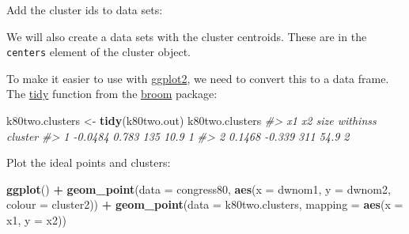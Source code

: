 \documentclass[]{book}
\newenvironment{Shaded}{\begin{snugshade}}{\end{snugshade}}
\newcommand{\CommentTok}[1]{\textcolor[rgb]{0.56,0.35,0.01}{\textit{#1}}}
\newcommand{\DataTypeTok}[1]{\textcolor[rgb]{0.13,0.29,0.53}{#1}}
\newcommand{\DecValTok}[1]{\textcolor[rgb]{0.00,0.00,0.81}{#1}}
\newcommand{\KeywordTok}[1]{\textcolor[rgb]{0.13,0.29,0.53}{\textbf{#1}}}
\newcommand{\NormalTok}[1]{#1}
\newcommand{\OperatorTok}[1]{\textcolor[rgb]{0.81,0.36,0.00}{\textbf{#1}}}
\newcommand{\StringTok}[1]{\textcolor[rgb]{0.31,0.60,0.02}{#1}}
\theoremstyle{definition}
\theoremstyle{definition}
\theoremstyle{definition}
\theoremstyle{remark}
\begin{document}
Add the cluster ids to data sets:

\begin{Shaded}
\end{Shaded}

We will also create a data sets with the cluster centroids. These are in
the \texttt{centers} element of the cluster object.

\begin{Shaded}
\end{Shaded}

To make it easier to use with
\href{https://cran.r-project.org/package=ggplot2}{ggplot2}, we need to
convert this to a data frame. The
\href{https://www.rdocumentation.org/packages/broom/topics/tidy}{tidy}
function from the \href{https://cran.r-project.org/package=broom}{broom}
package:

\begin{Shaded}
\begin{Highlighting}[]
\NormalTok{k80two.clusters <-}\StringTok{ }\KeywordTok{tidy}\NormalTok{(k80two.out)}
\NormalTok{k80two.clusters}
\CommentTok{#>        x1     x2 size withinss cluster}
\CommentTok{#> 1 -0.0484  0.783  135     10.9       1}
\CommentTok{#> 2  0.1468 -0.339  311     54.9       2}
\end{Highlighting}
\end{Shaded}

Plot the ideal points and clusters:

\begin{Shaded}
\begin{Highlighting}[]
\KeywordTok{ggplot}\NormalTok{() }\OperatorTok{+}
\StringTok{  }\KeywordTok{geom_point}\NormalTok{(}\DataTypeTok{data =}\NormalTok{ congress80,}
             \KeywordTok{aes}\NormalTok{(}\DataTypeTok{x =}\NormalTok{ dwnom1, }\DataTypeTok{y =}\NormalTok{ dwnom2, }\DataTypeTok{colour =}\NormalTok{ cluster2)) }\OperatorTok{+}
\StringTok{  }\KeywordTok{geom_point}\NormalTok{(}\DataTypeTok{data =}\NormalTok{ k80two.clusters, }\DataTypeTok{mapping =} \KeywordTok{aes}\NormalTok{(}\DataTypeTok{x =}\NormalTok{ x1, }\DataTypeTok{y =}\NormalTok{ x2))}
\end{Highlighting}
\end{Shaded}
\end{document}

